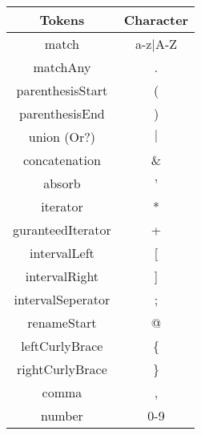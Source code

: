 \begin{tabular}{|c|c|}
    \hline
    \textbf{Tokens} & \textbf{Character}\\
    \hline
    match & a-z$\mid$A-Z\\
    \hline
    matchAny & .\\
    \hline
    parenthesisStart & (\\
    \hline
    parenthesisEnd & )\\
    \hline
    union (Or?) & $\mid$\\
    \hline
    concatenation & \&\\
    \hline
    absorb & '\\
    \hline
    iterator & *\\
    \hline
    guranteedIterator & +\\
    \hline
    intervalLeft & [\\
    \hline
    intervalRight & ]\\
    \hline
    intervalSeperator & ;\\
    \hline
    renameStart & @\\
    \hline
    leftCurlyBrace & \{\\
    \hline
    rightCurlyBrace & \}\\
    \hline
    comma & ,\\
    \hline
    number & 0-9\\
    \hline
\end{tabular}